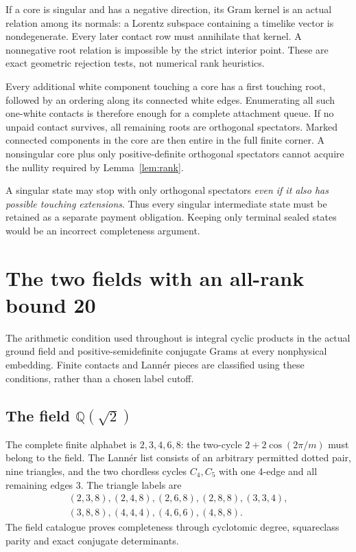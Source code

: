 \documentclass[11pt]{article}
\newcommand{\Q}{\mathbb Q}
\begin{document}
If a core is singular and has a negative direction, its Gram kernel is an
actual relation among its normals: a Lorentz subspace containing a timelike
vector is nondegenerate. Every later contact row must annihilate that
kernel. A nonnegative root relation is impossible by the strict interior
point. These are exact geometric rejection tests, not numerical rank
heuristics.

Every additional white component touching a core has a first touching
root, followed by an ordering along its connected white edges. Enumerating
all such one-white contacts is therefore enough for a complete attachment
queue. If no unpaid contact survives, all remaining roots are orthogonal
spectators. Marked connected components in the core are then entire in
the full finite corner. A nonsingular core plus only positive-definite
orthogonal spectators cannot acquire the nullity required by
Lemma~\ref{lem:rank}.

A singular state may stop with only orthogonal spectators \emph{even if it
also has possible touching extensions}. Thus every singular intermediate
state must be retained as a separate payment obligation. Keeping only
terminal sealed states would be an incorrect completeness argument.

\section{The two fields with an all-rank bound 20}
The arithmetic condition used throughout is integral cyclic products in
the actual ground field and positive-semidefinite conjugate Grams at every
nonphysical embedding. Finite contacts and Lann\'er pieces are classified
using these conditions, rather than a chosen label cutoff.

\subsection{The field \texorpdfstring{$\Q(\sqrt 2)$}{Q(sqrt2)}}
The complete finite alphabet is $2,3,4,6,8$: the two-cycle
$2+2\cos(2\pi/m)$ must belong to the field. The Lann\'er list consists of
an arbitrary permitted dotted pair, nine triangles, and the two chordless
cycles $C_4,C_5$ with one 4-edge and all remaining edges 3. The triangle
labels are
\[
\begin{gathered}
(2,3,8),(2,4,8),(2,6,8),(2,8,8),(3,3,4),\\
(3,8,8),(4,4,4),(4,6,6),(4,8,8).
\end{gathered}
\]
The field catalogue proves completeness through cyclotomic degree,
squareclass parity and exact conjugate determinants.
\end{document}

